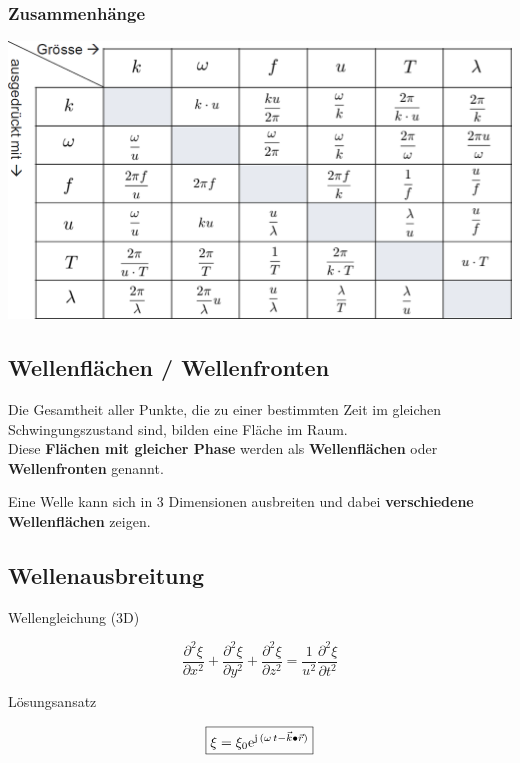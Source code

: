 \subsubsection{Zusammenhänge}
\includegraphics[width=0.8\linewidth]{Bilder/Wellen-Optik/harmonische_wellen_zusammenhaenge}






\subsection{Wellenflächen / Wellenfronten}
Die Gesamtheit aller Punkte, die zu einer bestimmten Zeit im gleichen Schwingungszustand sind, bilden eine Fläche im Raum. \\

Diese \textbf{Flächen mit gleicher Phase} werden als \textbf{Wellenflächen} oder \textbf{Wellenfronten} genannt.\\
\vspace{0.2cm}

Eine Welle kann sich in 3 Dimensionen ausbreiten und dabei \textbf{verschiedene Wellenflächen} zeigen. 




\subsection{Wellenausbreitung}

\begin{minipage}{0.25\linewidth}
Wellengleichung (3D)
\end{minipage}
\hfill
\begin{minipage}{0.73\linewidth}
$$\boxed{ \frac{\partial^2 \xi}{\partial x^2} + \frac{\partial^2 \xi}{\partial y^2} + \frac{\partial^2 \xi}{\partial z^2} = \frac{1}{u^2} \frac{\partial^2 \xi}{\partial t^2}  }$$
\end{minipage}

\begin{minipage}{0.25\linewidth}
Lösungsansatz \\
\end{minipage}
\hfill
\begin{minipage}{0.73\linewidth}
$$ \boxed{ \xi = \xi_0 \mathrm{e}^{\mathrm{j} \, (\omega \, t - \vec{k} \bullet \vec{r})} }$$ \\
\end{minipage}

